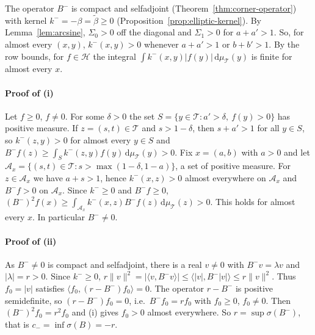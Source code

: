 \documentclass[preprint,12pt,a4paper]{elsarticle}
\theoremstyle{remark}
\newcommand{\dd}{\,\mathrm d}
\begin{document}
The operator $B^-$ is compact and selfadjoint (Theorem~\ref{thm:corner-operator}) with
kernel $k^-=-\beta=\tilde\beta\ge0$ (Proposition~\ref{prop:elliptic-kernel}).
By Lemma~\ref{lem:arcsine}, $\Sigma_0>0$ off the diagonal and $\Sigma_1>0$ for $a+a'>1$. So, for
almost every $(x,y)$, $k^-(x,y)>0$ whenever $a+a'>1$ or $b+b'>1$. By the row bounds, for
$f\in\mathcal H$ the integral $\int k^-(x,y)|f(y)|\dd\mu_{\mathcal T}(y)$ is finite for almost every $x$.

\paragraph{Proof of (i)}
Let $f\ge0$, $f\ne0$. For some $\delta>0$ the set $S=\{y\in\mathcal T:a'>\delta,\ f(y)>0\}$ has positive
measure. If $z=(s,t)\in\mathcal T$ and $s>1-\delta$, then $s+a'>1$ for all $y\in S$, so
$k^-(z,y)>0$ for almost every $y\in S$ and $B^-f(z)\ge\int_Sk^-(z,y)f(y)\dd\mu_{\mathcal T}(y)>0$.
Fix $x=(a,b)$ with $a>0$ and let $\mathcal A_x=\{(s,t)\in\mathcal T:s>\max(1-\delta,1-a)\}$, a set of
positive measure. For $z\in \mathcal A_x$ we have $a+s>1$, hence $k^-(x,z)>0$ almost everywhere on $\mathcal A_x$
and $B^-f>0$ on $\mathcal A_x$. Since $k^-\ge0$ and $B^-f\ge0$,
$(B^-)^2f(x)\ge\int_{\mathcal A_x}k^-(x,z)B^-f(z)\dd\mu_{\mathcal T}(z)>0$. This holds for almost every $x$. In
particular $B^-\ne0$.

\paragraph{Proof of (ii)}
As $B^-\ne0$ is compact and selfadjoint, there is a real $v\ne0$ with $B^-v=\lambda v$ and
$|\lambda|=r>0$. Since $k^-\ge0$,
$r\|v\|^2=|\langle v,B^-v\rangle|\le\langle|v|,B^-|v|\rangle\le r\|v\|^2$. Thus
$f_0=|v|$ satisfies $\langle f_0,(r-B^-)f_0\rangle=0$. The operator $r-B^-$ is positive semidefinite,
so $(r-B^-)f_0=0$, i.e.\ $B^-f_0=rf_0$ with $f_0\ge0$, $f_0\ne0$. Then $(B^-)^2f_0=r^2f_0$ and (i)
gives $f_0>0$ almost everywhere. So $r=\sup\sigma(B^-)$, that is $c_-=\inf\sigma(B)=-r$.
\end{document}
